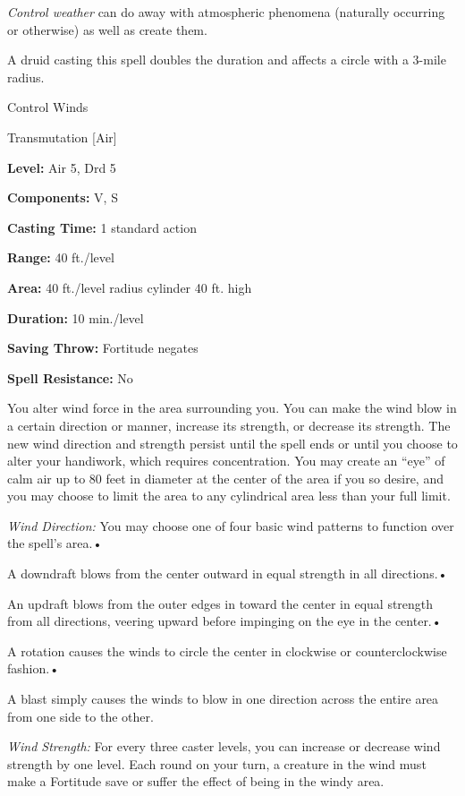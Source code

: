\documentclass{article}
\begin{document}
\textit{Control weather }can do away with atmospheric phenomena (naturally occurring 
or otherwise) as well as create them.

A druid casting this spell doubles the duration and affects a circle with a 3-mile 
radius.

\vspace{12pt}
Control Winds

Transmutation [Air]

\textbf{Level:} Air 5, Drd 5

\textbf{Components:} V, S

\textbf{Casting Time:} 1 standard action

\textbf{Range:} 40 ft./level

\textbf{Area:} 40 ft./level radius cylinder 40 ft. high

\textbf{Duration:} 10 min./level

\textbf{Saving Throw:} Fortitude negates

\textbf{Spell Resistance:} No

You alter wind force in the area surrounding you. You can make the wind blow in 
a certain direction or manner, increase its strength, or decrease its strength. 
The new wind direction and strength persist until the spell ends or until you choose 
to alter your handiwork, which requires concentration. You may create an ``eye'' 
of calm air up to 80 feet in diameter at the center of the area if you so desire, 
and you may choose to limit the area to any cylindrical area less than your full 
limit.

\textit{Wind Direction: }You may choose one of four basic wind patterns to function 
over the spell's area.• 

A downdraft blows from the center outward in equal strength in all directions.• 

An updraft blows from the outer edges in toward the center in equal strength from 
all directions, veering upward before impinging on the eye in the center.• 

A rotation causes the winds to circle the center in clockwise or counterclockwise 
fashion.• 

A blast simply causes the winds to blow in one direction across the entire area 
from one side to the other.

\textit{Wind Strength: }For every three caster levels, you can increase or decrease 
wind strength by one level. Each round on your turn, a creature in the wind must 
make a Fortitude save or suffer the effect of being in the windy area.
\end{document}
